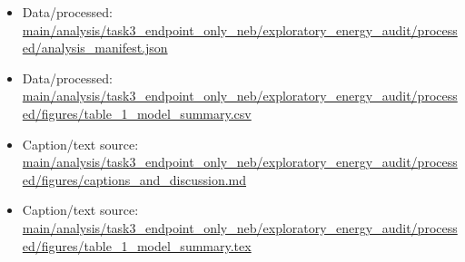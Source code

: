 \begin{itemize}[leftmargin=1.4em,noitemsep]
\item Data/processed: \begingroup\scriptsize\url{main/analysis/task3_endpoint_only_neb/exploratory_energy_audit/processed/analysis_manifest.json}\endgroup
\item Data/processed: \begingroup\scriptsize\url{main/analysis/task3_endpoint_only_neb/exploratory_energy_audit/processed/figures/table_1_model_summary.csv}\endgroup
\item Caption/text source: \begingroup\scriptsize\url{main/analysis/task3_endpoint_only_neb/exploratory_energy_audit/processed/figures/captions_and_discussion.md}\endgroup
\item Caption/text source: \begingroup\scriptsize\url{main/analysis/task3_endpoint_only_neb/exploratory_energy_audit/processed/figures/table_1_model_summary.tex}\endgroup
\end{itemize}
